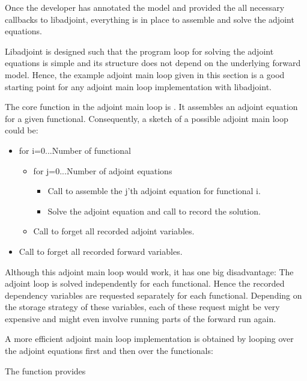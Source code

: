 Once the developer has annotated the model and provided the all necessary callbacks to libadjoint, 
everything is in place to assemble and solve the adjoint equations. 

Libadjoint is designed such that the program loop for solving the adjoint equations is simple
and its structure does not depend on the underlying forward model.
Hence, the example adjoint main loop given in this section is a good starting point for any adjoint main loop implementation with libadjoint.

The core function in the adjoint main loop is .
It assembles an adjoint equation for a given functional. 
Consequently, a sketch of a possible  adjoint main loop could be:

\begin{itemize}
\item{{for i=0...Number of functional}}
    \begin{itemize}
      \item{for j=0...Number of adjoint equations} 
      \begin{itemize}
        \item{Call  to assemble the j'th adjoint equation for functional i.}
        \item{Solve the adjoint equation and call  to record the solution.}
      \end{itemize}
      \item{Call  to forget all recorded adjoint variables.}
    \end{itemize}
\item{Call  to forget all recorded forward variables.}
\end{itemize}

Although this adjoint main loop would work, it has one big disadvantage: 
The adjoint loop is solved independently for each functional. 
Hence the recorded dependency variables are requested separately for each functional. 
Depending on the storage strategy of these variables, each of these request might be very expensive and might even involve running parts of the forward run again.

A more efficient adjoint main loop implementation is obtained by looping over the adjoint equations first and then over the functionals:



The function  provides 


